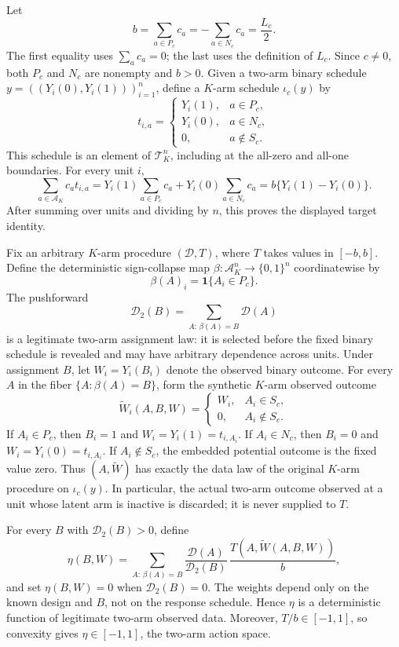 Let
\[
 b=\sum_{a\in P_c}c_a=-\sum_{a\in N_c}c_a=\frac{L_c}{2}.
\]
The first equality uses \(\sum_a c_a=0\); the last uses the definition of \(L_c\).  Since \(c\neq0\), both \(P_c\) and \(N_c\) are nonempty and \(b>0\).  Given a two-arm binary schedule \(y=((Y_i(0),Y_i(1)))_{i=1}^n\), define a \(K\)-arm schedule \(\iota_c(y)\) by
\[
 t_{i,a}=\begin{cases}
 Y_i(1),&a\in P_c,\\
 Y_i(0),&a\in N_c,\\
 0,&a\notin S_c.
 \end{cases}
\]
This schedule is an element of \(\mathcal T_K^n\), including at the all-zero and all-one boundaries.  For every unit \(i\),
\[
 \sum_{a\in\mathcal A_K}c_at_{i,a}
 =Y_i(1)\sum_{a\in P_c}c_a+Y_i(0)\sum_{a\in N_c}c_a
 =b\{Y_i(1)-Y_i(0)\}.
\]
After summing over units and dividing by \(n\), this proves the displayed target identity.

Fix an arbitrary \(K\)-arm procedure \((\mathcal D,T)\), where \(T\) takes values in \([-b,b]\).  Define the deterministic sign-collapse map \(\beta:\mathcal A_K^n\to\{0,1\}^n\) coordinatewise by
\[
 \beta(A)_i=\mathbf 1\{A_i\in P_c\}.
\]
The pushforward
\[
 \mathcal D_2(B)=\sum_{A:\,\beta(A)=B}\mathcal D(A)
\]
is a legitimate two-arm assignment law: it is selected before the fixed binary schedule is revealed and may have arbitrary dependence across units.  Under assignment \(B\), let \(W_i=Y_i(B_i)\) denote the observed binary outcome.  For every \(A\) in the fiber \(\{A:\beta(A)=B\}\), form the synthetic \(K\)-arm observed outcome
\[
 \widetilde W_i(A,B,W)=
 \begin{cases}
 W_i,&A_i\in S_c,\\
 0,&A_i\notin S_c.
 \end{cases}
\]
If \(A_i\in P_c\), then \(B_i=1\) and \(W_i=Y_i(1)=t_{i,A_i}\).  If \(A_i\in N_c\), then \(B_i=0\) and \(W_i=Y_i(0)=t_{i,A_i}\).  If \(A_i\notin S_c\), the embedded potential outcome is the fixed value zero.  Thus \((A,\widetilde W)\) has exactly the data law of the original \(K\)-arm procedure on \(\iota_c(y)\).  In particular, the actual two-arm outcome observed at a unit whose latent arm is inactive is discarded; it is never supplied to \(T\).

For every \(B\) with \(\mathcal D_2(B)>0\), define
\[
 \eta(B,W)=
 \sum_{A:\,\beta(A)=B}
 \frac{\mathcal D(A)}{\mathcal D_2(B)}\,
 \frac{T(A,\widetilde W(A,B,W))}{b},
\]
and set \(\eta(B,W)=0\) when \(\mathcal D_2(B)=0\).  The weights depend only on the known design and \(B\), not on the response schedule.  Hence \(\eta\) is a deterministic function of legitimate two-arm observed data.  Moreover, \(T/b\in[-1,1]\), so convexity gives \(\eta\in[-1,1]\), the two-arm action space.

